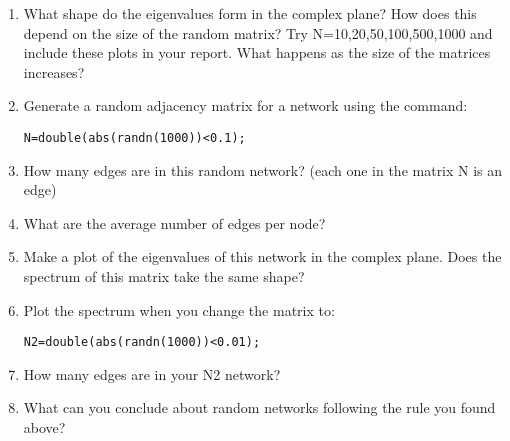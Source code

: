 \documentclass[11pt, a4paper]{article}
\begin{document}
\begin{enumerate}
\begin{enumerate}
\item What shape do the eigenvalues form in the complex plane? How does this depend on the size of the random matrix? Try N=10,20,50,100,500,1000 and include these plots in your report.  What happens as the size of the matrices increases?
\item Generate a random adjacency matrix for a network using the command:
\begin{lstlisting}
N=double(abs(randn(1000))<0.1);
\end{lstlisting}
\item How many edges are in this random network? (each one in the matrix N is an edge)
\item What are the average number of edges per node? 
\item Make a plot of the eigenvalues of this network in the complex plane. Does the spectrum of this matrix take the same shape?
\item Plot the spectrum when you change the matrix to:
\begin{lstlisting}
N2=double(abs(randn(1000))<0.01);
\end{lstlisting}
\item How many edges are in your N2 network? 
\item What can you conclude about random networks following the rule you found above?
\end{enumerate}





\end{enumerate}


\end{document}
